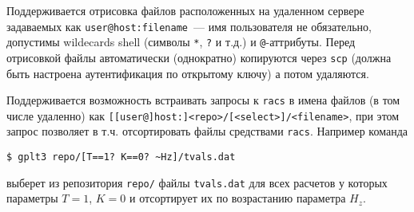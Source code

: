 \documentclass[12pt]{article}
\begin{document}
Поддерживается отрисовка файлов расположенных на удаленном сервере задаваемых как \verb'user@host:filename'~---
имя пользователя не  обязательно, допустимы wildecards shell (символы \verb'*', \verb'?' и т.д.) и \verb'@'-аттрибуты.
Перед отрисовкой файлы автоматически (однократно) копируются через \verb'scp' (должна быть настроена аутентификация по открытому ключу) а потом удаляются.

Поддерживается возможность встраивать запросы к \verb'racs'  в имена файлов (в том числе удаленно) как 
\verb'[[user@]host:]<repo>/[<select>]/<filename>', при этом запрос позволяет в т.ч. отсортировать файлы средствами \verb'racs'.
Например команда
\begin{verbatim}
$ gplt3 repo/[T==1? K==0? ~Hz]/tvals.dat
\end{verbatim}
выберет из репозитория \verb'repo/' файлы \verb'tvals.dat' для всех расчетов у которых параметры $T=1$, $K=0$ и отсортирует их по возрастанию параметра $H_z$.


\end{document}
